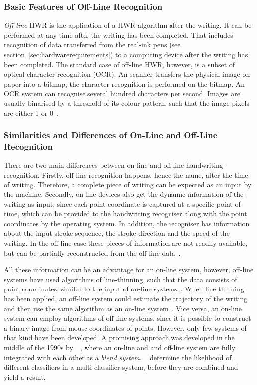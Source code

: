 \subsubsection{Basic Features of Off-Line Recognition}
\label{sec:basicfeaturesofofflinerecognition}

\emph{Off-line} HWR is the application of a HWR algorithm after the writing.
It can be performed at any time after the writing has been completed. That 
includes recognition of data transferred from the real-ink pens 
(see section~\ref{sec:hardwarerequirements}) to a computing device after the 
writing has been completed. The standard case of off-line HWR, however, is a 
subset of optical character recognition (OCR). An scanner transfers the physical 
image on paper into a bitmap, the character recognition is performed on the 
bitmap.
An OCR system can recognise several hundred characters per second. Images are
usually binarised by a threshold of its colour pattern, such that the image
pixels are either 1 or 0~.

\subsubsection[Similarities and Differences]{Similarities and Differences of On-Line and Off-Line  Recognition}
\label{sec:similaritiesanddifferences}

There are two main differences between on-line and off-line handwriting
recognition. Firstly, off-line recognition happens, hence the name, 
after the time of writing. Therefore, a complete piece of writing can be 
expected as an input by the machine. Secondly, on-line devices also get the
dynamic information of the writing as input, since each point coordinate 
is captured at a specific point of time, which can be provided to the 
handwriting recogniser along with the point coordinates by the operating system.
In addition, the recogniser has information about the input stroke sequence, 
the stroke direction and the speed of the writing. In the off-line case these 
pieces of information are not readily available, but can be partially 
reconstructed from the off-line data~.

All these information can be an advantage for an on-line system, however, 
off-line systems have used algorithms of line-thinning, such that the data 
consists of point coordinates, similar to the input of on-line 
systems~. When line thinning has been applied, an off-line 
system could estimate the trajectory of the writing and then use the same 
algorithm as an on-line system~. 
Vice versa, an on-line system can employ algorithms of off-line systems, 
since it is possible to construct a binary image from mouse coordinates 
of points. However, only few systems of that kind have been developed. 
A promising approach was developed in the middle of the 1990s 
by~~\citeyear{Nishida1995}, where an on-line and and off-line system are 
fully integrated with each other as a \emph{blend system}.
~\citeyear{Velek2002a} determine the likelihood of different classifiers in
a multi-classifier system, before they are combined and yield a result.

